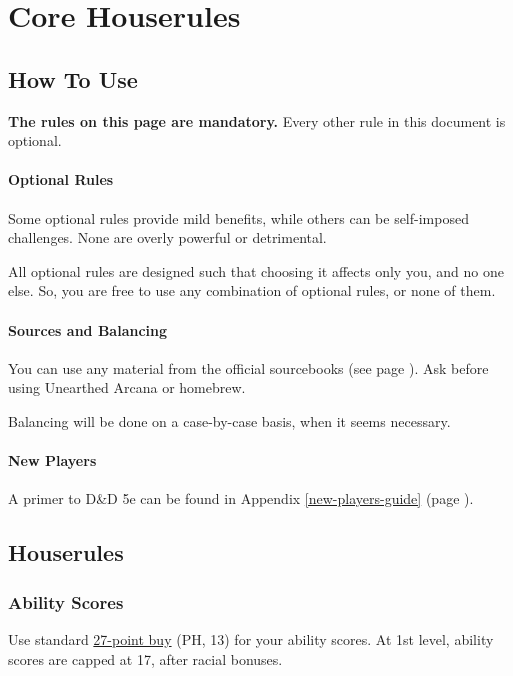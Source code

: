 \documentclass[letterpaper,twocolumn,openany,nodeprecatedcode,bg=print]{dndbook}
\newcommand{\pg}[1]{page \pageref{#1}}
\newcommand{\see}[1]{(see \pg{#1})}
\begin{document}




\chapter{Core Houserules}

\noindent [Version 8.0.0]

\section{How To Use}
\textbf{The rules on this page are mandatory.}
Every other rule in this document is optional.

\subsubsection{Optional Rules}
Some optional rules provide mild benefits, while others can be self-imposed challenges. 
None are overly powerful or detrimental. 

All optional rules are designed such that choosing it affects only you, and no one else. 
So, you are free to use any combination of optional rules, or none of them.

\subsubsection{Sources and Balancing}
You can use any material from the official sourcebooks \see{sources}. 
Ask before using Unearthed Arcana or homebrew.

Balancing will be done on a case-by-case basis, when it seems necessary. 

\subsubsection{New Players}
A primer to D\&D 5e can be found in Appendix \ref{new-players-guide} (\pg{new-players-guide}).

\newpage
\section{Houserules}

\subsection{Ability Scores}
Use standard \href{https://chicken-dinner.com/5e/5e-point-buy.html}{27-point buy} (PH, 13) for your ability scores. 
At 1st level, ability scores are capped at 17, after racial bonuses.
\end{document}
